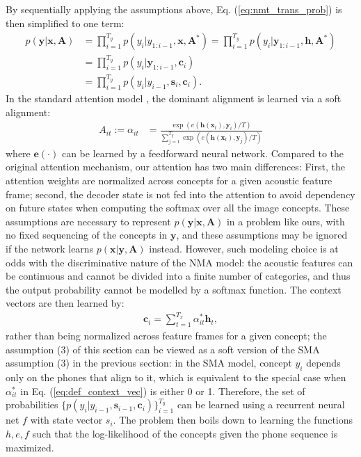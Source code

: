 \documentclass[journal]{IEEEtran}
\begin{document}
By sequentially applying the assumptions above, Eq. (\ref{eq:nmt_trans_prob}) is then simplified to one term:
\begin{align}\label{eq:nmt_trans_prob_simplify}
    p(\mathbf y|\mathbf x, \mathbf A)&= \prod_{i=1}^{T_y} p(y_i|y_{1:i-1}, \mathbf{x}, \mathbf{A}^*) = \prod_{i=1}^{T_y} p(y_i|\mathbf y_{1:i-1}, \mathbf h, \mathbf{A}^*)\\
    &= \prod_{i=1}^{T_y} p(y_i|\mathbf y_{1:i-1}, \mathbf c_i)\\
    &= \prod_{i=1}^{T_y} p(y_i|y_{i-1}, \mathbf s_i, \mathbf c_i).
\end{align}
In the standard attention model \cite{Bahdanau14}, the dominant alignment is learned via a soft alignment:
\begin{align}\label{eq:def_soft_align}
    A_{it}:= \alpha_{it} &= \frac{\exp(e(\mathbf h(\mathbf x_t), \mathbf y_i)/T)}{\sum_{j=1}^{T_y} \exp(e(\mathbf h(\mathbf{x}_t), \mathbf y_j)/T)}
\end{align}
where $\mathbf e(\cdot)$ can be learned by a feedforward neural network. Compared to the original attention mechanism, our attention has two main differences: First, the attention weights are normalized across concepts for a given acoustic feature frame; second, the decoder state is not fed into the attention to avoid dependency on future states when computing the softmax over all the image concepts. These assumptions are necessary to represent $p(\mathbf y|\mathbf x, \mathbf A)$ in a problem like ours, with no fixed sequencing of the concepts in $\mathbf y$, and these assumptions may be ignored if the network learns $p(\mathbf x|\mathbf y, \mathbf A)$ instead. However, such modeling choice is at odds with the discriminative nature of the NMA model: the acoustic features can be  continuous and cannot be divided into a finite number of categories, and thus the output probability cannot be modelled by a softmax function. The context vectors are then learned by:
\begin{align}\label{eq:def_context_vec}
    \mathbf c_i = \sum_{t=1}^{T_x} \alpha_{it}^* \mathbf h_t,
\end{align}
rather than being normalized across feature frames for a given concept; the assumption (3) of this section can be viewed as a soft version of the SMA assumption (3) in the previous section:  in the SMA model, concept $y_i$ depends only on the phones that align to it, which is equivalent to the special case when $\alpha_{it}^*$ in Eq. (\ref{eq:def_context_vec}) is either 0 or 1. Therefore, the set of probabilities $\{p(y_i|y_{i-1}, \mathbf s_{i-1}, \mathbf c_i)\}_{i=1}^{T_y}$ can be learned using a recurrent neural net $f$ with state vector $s_i$. The problem then boils down to learning the functions $h, e, f$ such that the log-likelihood of the concepts given the phone sequence is maximized.
\end{document}
